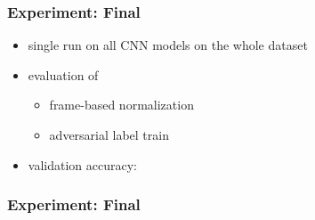 \begin{frame}
  \frametitle{Experiment: Final}
  \begin{itemize}
    \item single run on all CNN models on the whole dataset
    \item evaluation of
    \begin{itemize}
     \item frame-based normalization
     \item adversarial label train
    \end{itemize}
    \item validation accuracy:
    \vspace{-0.5cm}
  \begin{figure}[!ht]
    \centering
  \end{figure}
  \end{itemize}
\end{frame}

\begin{frame}
  \frametitle{Experiment: Final}
  
\end{frame}

